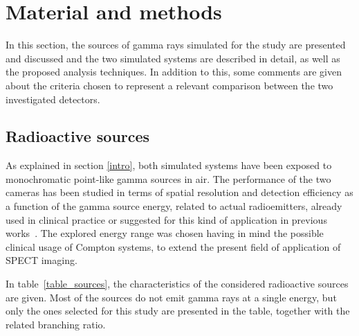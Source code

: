 \section{Material and methods}\label{mat_met}
In this section, the sources of gamma rays simulated for the study are presented and discussed and the two simulated systems are described in detail, as well as the proposed analysis techniques. In addition to this, some comments are given about the criteria chosen to represent a relevant comparison between the two investigated detectors.

\subsection{Radioactive sources}\label{rad_sources}

As explained in section \ref{intro}, both  simulated systems have been exposed to monochromatic point-like gamma sources in air.
The performance of the two cameras has been studied in terms of spatial resolution and detection efficiency as a function of the gamma source energy, related to actual radioemitters, already used in clinical practice or suggested for this kind of application in previous works~\cite{Nurdan_sources}. The explored energy range was chosen having in mind the possible clinical usage of Compton systems, to extend the present field of application of SPECT imaging.

In table~\ref{table_sources}, the characteristics of the considered radioactive sources are given. Most of the sources do not emit gamma rays at a single energy, but only the ones selected for this study are presented in the table, together with the related branching ratio.

